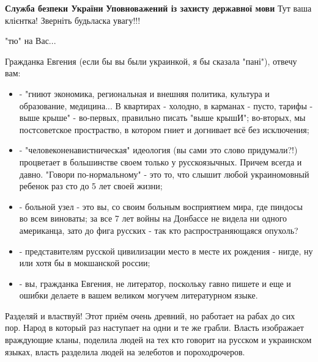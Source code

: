 \begin{itemize}

\textbf{Служба безпеки України}
\textbf{Уповноважений із захисту державної мови}
Тут ваша клієнтка!
Зверніть будьласка увагу!!!


"тю" на Вас...



Гражданка Евгения (если бы вы были украинкой, я бы сказала "пані"), отвечу вам:

\begin{itemize}
\item - "гниют экономика, региональная и внешняя политика, культура и образование,
медицина... В квартирах - холодно, в карманах - пусто, тарифы - выше крыше" -
во-первых, правильно писать "выше крышИ"; во-вторых, мы постсоветское
простраство, в котором гниет и догнивает всё без исключения;

\item - "человеконенавистническая" идеология (вы сами это слово придумали?!)
процветает в большинстве своем только у русскоязычных. Причем всегда и давно.
"Говори по-нормальному" - это то, что слышит любой украиномовный ребенок раз
сто до 5 лет своей жизни;

\item - больной узел - это вы, со своим больным восприятием мира, где пиндосы во всем
виноваты; за все 7 лет войны на Донбассе не видела ни одного американца, зато
до фига русских - так кто распространяющаяся опухоль?

\item - представителям русской цивилизации место в месте их рождения - нигде, ну или
хотя бы в мокшанской россии;

\item - вы, гражданка Евгения, не литератор, поскольку гавно пишете и еще и ошибки
делаете в вашем великом могучем литературном языке.
\end{itemize}



Разделяй и властвуй! Этот приём очень древний, но работает на рабах до сих пор.
Народ в который раз наступает на одни и те же грабли. Власть изображает
враждующие кланы, поделила людей на тех кто говорит на русском и украинском
языках, власть разделила людей на зелеботов и пороходрочеров.


\end{itemize}
